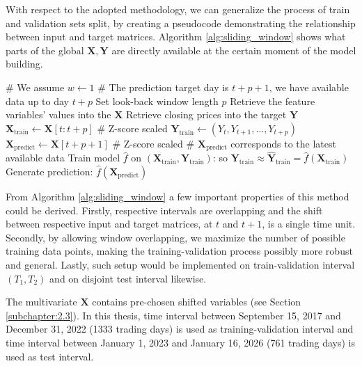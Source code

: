 With respect to the adopted methodology, we can generalize the process of train and validation sets split, by creating a pseudocode demonstrating the relationship
between input and target matrices. Algorithm \ref{alg:sliding_window} shows what parts of the global $\mathbf{X}, \mathbf{Y}$ are directly available at the certain moment of the model building.
\begin{algorithm}[H]
\caption{Rolling-window on $(T_1, T_2)$ interval}
\label{alg:sliding_window}
\begin{algorithmic}
\State \# We assume $w \gets 1$
\State \# The prediction target day is $t+p+1$, we have available data up to day $t+p$
\State Set look-back window length $p$ 
\State Retrieve the feature variables' values into the $\mathbf{X}$
    \State Retrieve closing prices into the target $\mathbf{Y}$
        \State $\mathbf{X}_{\text{train}} \gets \mathbf{X}[t : t+p]$  \>\>\>\>\>\>\> \# Z-score scaled
        \State $\mathbf{Y}_{\text{train}} \gets (Y_t, Y_{t+1}, \ldots, Y_{t+p})$
        \State $\mathbf{X}_{\text{predict}} \gets \mathbf{X}[t+p+1]$ \>\> \# Z-score scaled
        \State \# $\mathbf{X}_\text{predict}$ corresponds to the latest available data 
        \State Train model $\hat{f}$ on $(\mathbf{X}_{\text{train}}, \mathbf{Y}_{\text{train}})$: so $\mathbf{Y}_{\text{train}}\approx\hat{\mathbf{Y}}_{\text{train}}=\hat{f}(\mathbf{X}_{\text{train}})$ 
        \State Generate prediction: $\hat{f}(\mathbf{X}_{\text{predict}})$
    \EndFor
\EndFor
\end{algorithmic}
\end{algorithm}
\label{testing_sub}
From Algorithm \ref{alg:sliding_window} a few important properties of this method could be derived.
Firstly, respective intervals are overlapping and the shift between respective input and target matrices, at $t$ and $t+1$,
is a single time unit. Secondly, by allowing window overlapping, we maximize the number of possible training data points, 
making the training-validation process possibly more robust and general. Lastly, such setup would be implemented on train-validation interval $(T_1, T_2)$ and
on disjoint test interval likewise.

The multivariate $\mathbf{X}$ contains pre-chosen shifted variables (see Section \ref{subchapter:2.3}). In this thesis, time interval between September 15, 2017 and December 31, 2022 (1333 trading days)
is used as training-validation interval and time interval between January 1, 2023 and January 16, 2026 (761 trading days) is used as test interval.

